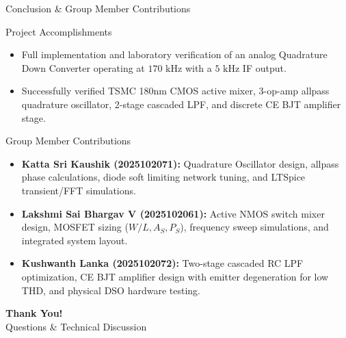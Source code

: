 \documentclass{beamer}
\begin{document}
\begin{frame}{Conclusion \& Group Member Contributions}
  \begin{block}{Project Accomplishments}
    \begin{itemize}
      \item Full implementation and laboratory verification of an analog Quadrature Down Converter operating at $170\text{ kHz}$ with a $5\text{ kHz}$ IF output.
      \item Successfully verified TSMC 180nm CMOS active mixer, 3-op-amp allpass quadrature oscillator, 2-stage cascaded LPF, and discrete CE BJT amplifier stage.
    \end{itemize}
  \end{block}

  \begin{block}{Group Member Contributions}
    \begin{itemize}
      \tiny
      \item \textbf{Katta Sri Kaushik (2025102071):} Quadrature Oscillator design, allpass phase calculations, diode soft limiting network tuning, and LTSpice transient/FFT simulations.
      \item \textbf{Lakshmi Sai Bhargav V (2025102061):} Active NMOS switch mixer design, MOSFET sizing ($W/L, A_S, P_S$), frequency sweep simulations, and integrated system layout.
      \item \textbf{Kushwanth Lanka (2025102072):} Two-stage cascaded RC LPF optimization, CE BJT amplifier design with emitter degeneration for low THD, and physical DSO hardware testing.
    \end{itemize}
  \end{block}
\end{frame}

\begin{frame}
  \centering
  \Huge \textbf{Thank You!} \\
  \vspace{0.5cm}
  \Large Questions \& Technical Discussion
\end{frame}
\end{document}
